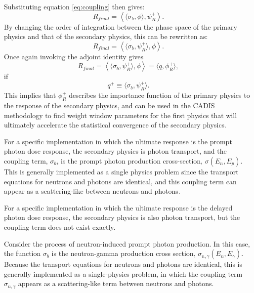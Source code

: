 Substituting equation \ref{eq:coupling} then gives:
\begin{equation}
  R_{final} = \left \langle \langle \sigma_b , \phi \rangle, \psi_R^{+} \right\rangle.
\end{equation}
By changing the order of integration between the phase space of the primary
physics and that of the secondary physics, this can be rewritten as:
\begin{equation}\label{eq:pseudo-response}
  R_{final} = \left \langle \langle \sigma_b , \psi_R^{+} \rangle, \phi \right\rangle.
\end{equation}
Once again invoking the adjoint identity gives
\begin{equation}
  R_{final} = \left \langle \langle \sigma_b , \psi_R^{+} \rangle, \phi \right\rangle = \langle q, \phi_R^{+} \rangle,
\end{equation}
if
\begin{equation}
  q^{+} \equiv \langle \sigma_b , \psi_R^{+} \rangle.
\end{equation}
This implies that $\phi_R^{+}$ describes the importance function of the
primary physics to the response of the secondary physics, and can be used in
the CADIS methodology to find weight window parameters for the first physics
that will ultimately accelerate the statistical convergence of the secondary
physics.

For a specific implementation in which the ultimate response is the prompt
photon dose response, the secondary physics is photon transport, and the
coupling term, $\sigma_b$, is the prompt photon production cross-section,
$\sigma(E_n,E_p)$.  This is generally implemented as a single physics problem
since the transport equations for neutrons and photons are identical, and this
coupling term can appear as a scattering-like between neutrons and photons.

For a specific implementation in which the ultimate response is the delayed
photon dose response, the secondary physics is also photon transport, but the
coupling term does not exist exactly.  

Consider the process of neutron-induced prompt photon production.
In this case, the function $\sigma_b$ is the neutron-gamma production
cross section, $\sigma_{n,\gamma}(E_n,E_\gamma)$.  Because the transport
equations for neutrons and photons are identical, this is generally
implemented as a single-physics problem, in which the coupling term
$\sigma_{n,\gamma}$ appears as a scattering-like term between neutrons
and photons.


